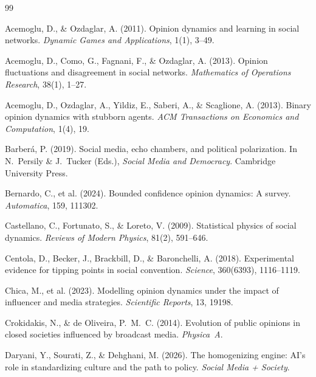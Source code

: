 \documentclass{article}
\theoremstyle{plain}
\theoremstyle{definition}
\theoremstyle{remark}
\begin{document}
\begin{thebibliography}{99}

Acemoglu, D., \& Ozdaglar, A. (2011).
Opinion dynamics and learning in social networks.
\textit{Dynamic Games and Applications}, 1(1), 3--49.

Acemoglu, D., Como, G., Fagnani, F., \& Ozdaglar, A. (2013).
Opinion fluctuations and disagreement in social networks.
\textit{Mathematics of Operations Research}, 38(1), 1--27.

Acemoglu, D., Ozdaglar, A., Yildiz, E., Saberi, A., \& Scaglione, A. (2013).
Binary opinion dynamics with stubborn agents.
\textit{ACM Transactions on Economics and Computation}, 1(4), 19.

Barber\'{a}, P. (2019).
Social media, echo chambers, and political polarization.
In N.~Persily \& J.~Tucker (Eds.),
\textit{Social Media and Democracy}.
Cambridge University Press.

Bernardo, C., et al. (2024).
Bounded confidence opinion dynamics: A survey.
\textit{Automatica}, 159, 111302.

Castellano, C., Fortunato, S., \& Loreto, V. (2009).
Statistical physics of social dynamics.
\textit{Reviews of Modern Physics}, 81(2), 591--646.

Centola, D., Becker, J., Brackbill, D., \& Baronchelli, A. (2018).
Experimental evidence for tipping points in social convention.
\textit{Science}, 360(6393), 1116--1119.

Chica, M., et al. (2023).
Modelling opinion dynamics under the impact of influencer and media strategies.
\textit{Scientific Reports}, 13, 19198.

Crokidakis, N., \& de Oliveira, P.~M.~C. (2014).
Evolution of public opinions in closed societies influenced by broadcast media.
\textit{Physica~A}.

Daryani, Y., Sourati, Z., \& Dehghani, M. (2026).
The homogenizing engine: AI's role in standardizing culture and the path to policy.
\textit{Social Media + Society}.


\end{thebibliography}
\end{document}
